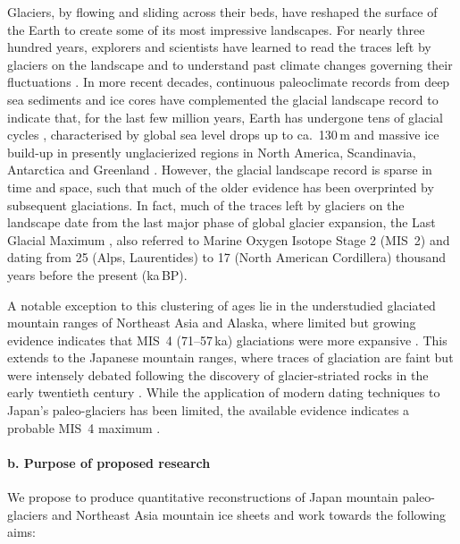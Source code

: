 \documentclass{article}
\begin{document}
    Glaciers, by flowing and sliding across their beds, have reshaped the
    surface of the Earth to create some of its most impressive landscapes. For
    nearly three hundred years, explorers and scientists have learned to read
    the traces left by glaciers on the landscape and to understand past climate
    changes governing their fluctuations \citep[e.g.,][]{Venetz.1821}.
    In more recent decades, continuous paleoclimate records from deep sea
    sediments and ice cores have complemented the glacial landscape record to
    indicate that, for the last few million years, Earth has undergone tens of
    glacial cycles \citep{Lisiecki.Raymo.2005}, characterised by global sea
    level drops up to ca.~130\,m and massive ice build-up in presently
    unglacierized regions in North America, Scandinavia, Antarctica and
    Greenland \citep{Ehlers.etal.2011}.
    However, the glacial landscape record is sparse in time and space, such
    that much of the older evidence has been overprinted by subsequent
    glaciations.  In fact, much of the traces left by glaciers on the landscape
    date from the last major phase of global glacier expansion, the Last
    Glacial Maximum \citep[LGM,][]{Heyman.etal.2011}, also referred to Marine
    Oxygen Isotope Stage 2 (MIS~2) and dating from 25 (Alps, Laurentides) to 17
    (North American Cordillera) thousand years before the present (ka\,BP).

    A notable exception to this clustering of ages lie in the understudied
    glaciated mountain ranges of Northeast Asia and Alaska, where limited but
    growing evidence indicates that MIS~4 (71--57\,ka) glaciations were more
    expansive \citep{Batchelor.etal.2019}. This extends to the Japanese
    mountain ranges, where traces of glaciation are faint but were intensely
    debated following the discovery of glacier-striated rocks in the early
    twentieth century \citep{Yamazaki.1902}. While the application of modern
    dating techniques to Japan's paleo-glaciers has been limited, the available
    evidence indicates a probable MIS~4 maximum \citep{Sawagaki.Aoki.2011}.


\paragraph{b. Purpose of proposed research}

    We propose to produce quantitative reconstructions of Japan mountain
    paleo-glaciers and Northeast Asia mountain ice sheets and work towards the
    following aims:
\end{document}

